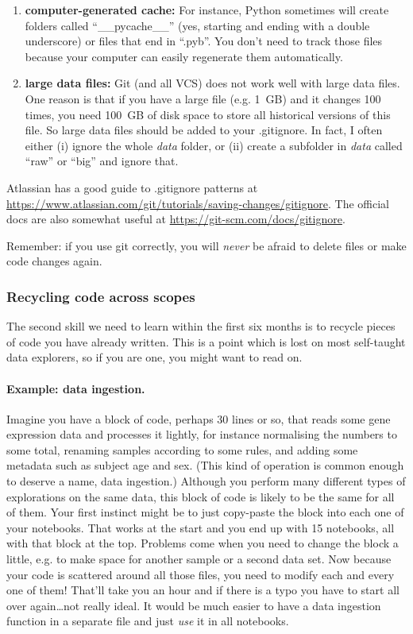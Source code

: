 \documentclass[12pt,a4paper,notitlepage,onecolumn]{article}
\begin{document}
\begin{enumerate}
\item \textbf{computer-generated cache:} For instance, Python sometimes will create folders called ``\_\_pycache\_\_'' (yes, starting and ending with a double underscore) or files that end in ``.pyb''. You don't need to track those files because your computer can easily regenerate them automatically.
\item \textbf{large data files:} Git (and all VCS) does not work well with large data files. One reason is that if you have a large file (e.g. 1~GB) and it changes 100 times, you need 100~GB of disk space to store all historical versions of this file. So large data files should be added to your .gitignore. In fact, I often either (i) ignore the whole \textit{data} folder, or (ii) create a subfolder in \textit{data} called ``raw'' or ``big'' and ignore that.
\end{enumerate}

Atlassian has a good guide to .gitignore patterns at \url{https://www.atlassian.com/git/tutorials/saving-changes/gitignore}. The official docs are also somewhat useful at \url{https://git-scm.com/docs/gitignore}.

Remember: if you use git correctly, you will \textit{never} be afraid to delete files or make code changes again.

\subsubsection{Recycling code across scopes}
The second skill we need to learn within the first six months is to recycle pieces of code you have already written. This is a point which is lost on most self-taught data explorers, so if you are one, you might want to read on.

\paragraph{Example: data ingestion.} Imagine you have a block of code, perhaps 30 lines or so, that reads some gene expression data and processes it lightly, for instance normalising the numbers to some total, renaming samples according to some rules, and adding some metadata such as subject age and sex. (This kind of operation is common enough to deserve a name, data ingestion.) Although you perform many different types of explorations on the same data, this block of code is likely to be the same for all of them. Your first instinct might be to just copy-paste the block into each one of your notebooks. That works at the start and you end up with 15 notebooks, all with that block at the top. Problems come when you need to change the block a little, e.g. to make space for another sample or a second data set. Now because your code is scattered around all those files, you need to modify each and every one of them! That'll take you an hour and if there is a typo you have to start all over again\dots not really ideal. It would be much easier to have a data ingestion function in a separate file and just \textit{use} it in all notebooks.
\end{document}
